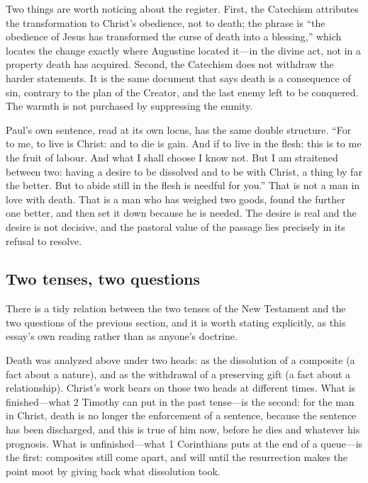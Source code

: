 Two things are worth noticing about the register. First, the Catechism attributes the transformation to Christ's obedience, not to death; the phrase is ``the obedience of Jesus has transformed the curse of death into a blessing,'' which locates the change exactly where Augustine located it---in the divine act, not in a property death has acquired. Second, the Catechism does not withdraw the harder statements. It is the same document that says death is a consequence of sin, contrary to the plan of the Creator, and the last enemy left to be conquered. The warmth is not purchased by suppressing the enmity.

Paul's own sentence, read at its own locus, has the same double structure. ``For to me, to live is Christ: and to die is gain. And if to live in the flesh: this is to me the fruit of labour. And what I shall choose I know not. But I am straitened between two: having a desire to be dissolved and to be with Christ, a thing by far the better. But to abide still in the flesh is needful for you.'' That is not a man in love with death. That is a man who has weighed two goods, found the further one better, and then set it down because he is needed. The desire is real and the desire is not decisive, and the pastoral value of the passage lies precisely in its refusal to resolve.

\subsection{Two tenses, two questions}

There is a tidy relation between the two tenses of the New Testament and the two questions of the previous section, and it is worth stating explicitly, as this essay's own reading rather than as anyone's doctrine.

Death was analyzed above under two heads: as the dissolution of a composite (a fact about a nature), and as the withdrawal of a preserving gift (a fact about a relationship). Christ's work bears on those two heads at different times. What is finished---what 2 Timothy can put in the past tense---is the second: for the man in Christ, death is no longer the enforcement of a sentence, because the sentence has been discharged, and this is true of him now, before he dies and whatever his prognosis. What is unfinished---what 1 Corinthians puts at the end of a queue---is the first: composites still come apart, and will until the resurrection makes the point moot by giving back what dissolution took.

